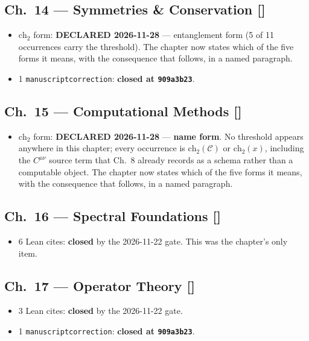 \subsection*{Ch.~14 --- Symmetries \& Conservation \hfill [\checkmark]}
\begin{itemize}
\item $\mathrm{ch}_2$ form: \textbf{DECLARED 2026-11-28} --- entanglement form (5 of 11 occurrences carry the threshold). The chapter now states which of the five forms it means, with the consequence that follows, in a named paragraph.
\item 1 \texttt{manuscriptcorrection}: \textbf{closed at \texttt{909a3b23}}.
\end{itemize}

\subsection*{Ch.~15 --- Computational Methods \hfill [\checkmark]}
\begin{itemize}
\item $\mathrm{ch}_2$ form: \textbf{DECLARED 2026-11-28} --- \textbf{name form}. No threshold appears anywhere in this chapter; every occurrence is $\mathrm{ch}_2(\mathcal{C})$ or $\mathrm{ch}_2(x)$, including the $C^{\mu\nu}$ source term that Ch.~8 already records as a schema rather than a computable object. The chapter now states which of the five forms it means, with the consequence that follows, in a named paragraph.
\end{itemize}

\subsection*{Ch.~16 --- Spectral Foundations \hfill [\checkmark]}
\begin{itemize}
\item 6 Lean cites: \textbf{closed} by the 2026-11-22 gate. This was the
chapter's only item.
\end{itemize}

\subsection*{Ch.~17 --- Operator Theory \hfill [\checkmark]}
\begin{itemize}
\item 3 Lean cites: \textbf{closed} by the 2026-11-22 gate.
\item 1 \texttt{manuscriptcorrection}: \textbf{closed at \texttt{909a3b23}}.
\end{itemize}


